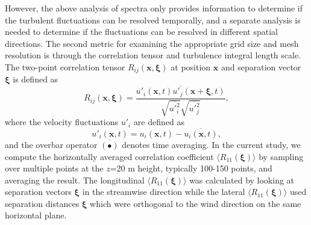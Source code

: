 However, the above analysis of spectra only provides information to
determine if the turbulent fluctuations can be resolved temporally,
and a separate analysis is needed to determine if the fluctuations can
be resolved in different spatial directions.  The second metric for
examining the appropriate grid size and mesh resolution is through the
correlation tensor and turbulence integral length scale.  The
two-point correlation tensor $R_{ij}(\mathbf{x},\boldsymbol{\xi})$ at
position $\mathbf{x}$ and separation vector $\boldsymbol{\xi}$ is
defined as
\begin{equation}
  \label{eq:Rij}
  R_{ij}({\mathbf x},\boldsymbol{\xi}) =
  \frac{\overline{ {u'_i(\mathbf{x}, t) u'_j(\mathbf{x}+\boldsymbol{\xi},t)} }}
       { \sqrt{\overline{ u'^2_i }} \sqrt{\overline{ u'^2_j}} },
\end{equation}
where the velocity fluctuations $u'_i$ are defined as
\begin{equation}
  u'_i(\mathbf{x},t) = u_i(\mathbf{x},t) - \overline{ u_i(\mathbf{x},t) },
\end{equation}
and the overbar operator $\overline{(\bullet)}$ denotes time
averaging.  In the current study, we compute the horizontally averaged
correlation coefficient $\langle R_{11}(\boldsymbol{\xi})\rangle$ by
sampling over multiple points at the $z$=20 m height, typically 100-150
points, and averaging the result.  The longitudinal $\langle
R_{11}(\boldsymbol{\xi})\rangle$ was calculated by looking at
separation vectors $\boldsymbol{\xi}$ in the streamwise direction
while the lateral $\langle R_{11}(\boldsymbol{\xi})\rangle$ used
separation distances $\boldsymbol{\xi}$ which were orthogonal to the
wind direction on the same horizontal plane.

